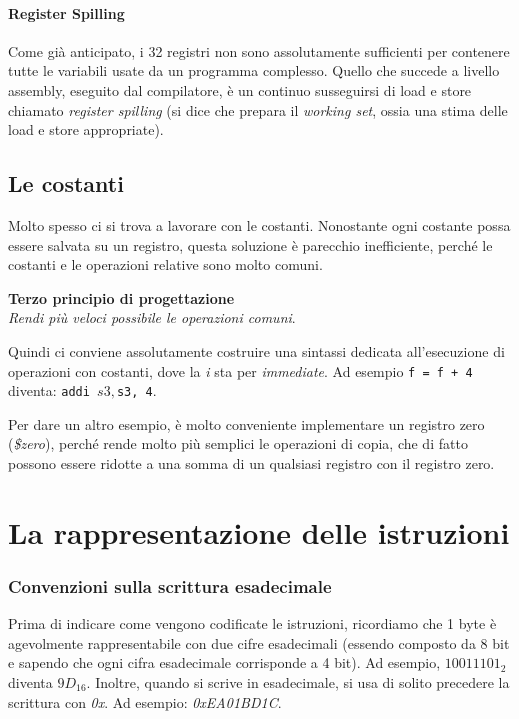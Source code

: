 \documentclass[class=book, crop=false]{standalone}
\begin{document}
\paragraph{Register Spilling}
Come già anticipato, i 32 registri non sono assolutamente sufficienti per contenere tutte le variabili usate da un programma complesso. Quello che succede a livello assembly, eseguito dal compilatore, è un continuo susseguirsi di load e store chiamato \emph{register spilling} (si dice che prepara il \emph{working set}, ossia una stima delle load e store appropriate).

\subsection*{Le costanti}
Molto spesso ci si trova a lavorare con le costanti. Nonostante ogni costante possa essere salvata su un registro, questa soluzione è parecchio inefficiente, perché le costanti e le operazioni relative sono molto comuni.

\vspace{8pt}
\begin{tcolorbox}
\centering
\textbf{Terzo principio di progettazione}\\
\emph{Rendi più veloci possibile le operazioni comuni}.
\end{tcolorbox}
\vspace{5pt}

Quindi ci conviene assolutamente costruire una sintassi dedicata all'esecuzione di operazioni con costanti, dove la \emph{i} sta per \emph{immediate}. Ad esempio \texttt{f = f + 4} diventa: \texttt{addi $s3, $s3, 4}.

Per dare un altro esempio, è molto conveniente implementare un registro zero (\emph{\$zero}), perché rende molto più semplici le operazioni di copia, che di fatto possono essere ridotte a una somma di un qualsiasi registro con il registro zero.

\section{La rappresentazione delle istruzioni}

\subsubsection{Convenzioni sulla scrittura esadecimale}
Prima di indicare come vengono codificate le istruzioni, ricordiamo che 1 byte è agevolmente rappresentabile con due cifre esadecimali (essendo composto da 8 bit e sapendo che ogni cifra esadecimale corrisponde a 4 bit). Ad esempio, \(1001 1101_{2}\) diventa \(9D_{16}\). Inoltre, quando si scrive in esadecimale, si usa di solito precedere la scrittura con \emph{0x}. Ad esempio: \emph{0xEA01BD1C}.
\end{document}
